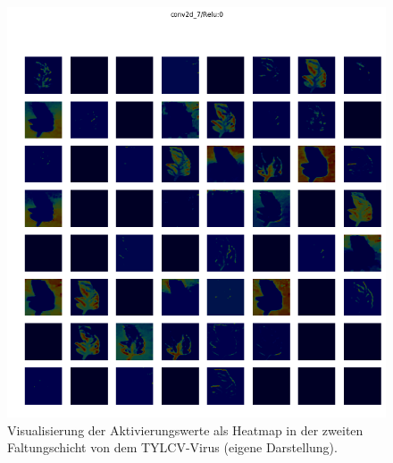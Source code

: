 \begin{figure}[h!]
	\centering
	\includegraphics[width=\textwidth]{visualisierungen/yellow/heapmap_mit/conv2d_7.png}
	\caption{Visualisierung der Aktivierungswerte als Heatmap in der zweiten Faltungschicht von dem TYLCV-Virus (eigene Darstellung).}
	\label{}
\end{figure}


